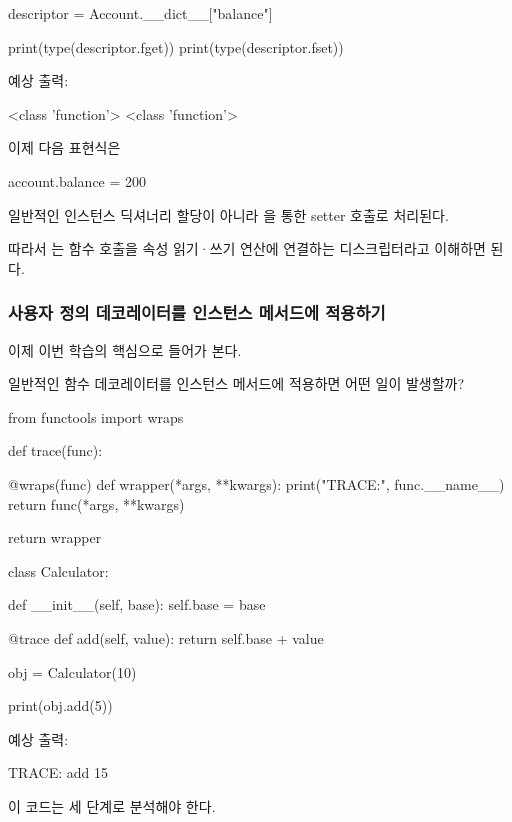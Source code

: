 \begin{dhkcode}
descriptor = Account.__dict__["balance"]

print(type(descriptor.fget))
print(type(descriptor.fset))
\end{dhkcode}

예상 출력:

\begin{dhkzsh}
<class 'function'>
<class 'function'>
\end{dhkzsh}

이제 다음 표현식은

\begin{dhkcode}
account.balance = 200
\end{dhkcode}

일반적인 인스턴스 딕셔너리 할당이 아니라 을 통한 setter 호출로 처리된다.

따라서 는 함수 호출을 속성 읽기·쓰기 연산에 연결하는 디스크립터라고 이해하면 된다.

\subsubsection{사용자 정의 데코레이터를 인스턴스 메서드에 적용하기}

이제 이번 학습의 핵심으로 들어가 본다.

일반적인 함수 데코레이터를 인스턴스 메서드에 적용하면 어떤 일이 발생할까?

\begin{dhkcode}
from functools import wraps


def trace(func):

    @wraps(func)
    def wrapper(*args, **kwargs):
        print("TRACE:", func.__name__)
        return func(*args, **kwargs)

    return wrapper


class Calculator:

    def __init__(self, base):
        self.base = base

    @trace
    def add(self, value):
        return self.base + value


obj = Calculator(10)

print(obj.add(5))
\end{dhkcode}

예상 출력:

\begin{dhkzsh}
TRACE: add
15
\end{dhkzsh}

이 코드는 세 단계로 분석해야 한다.

